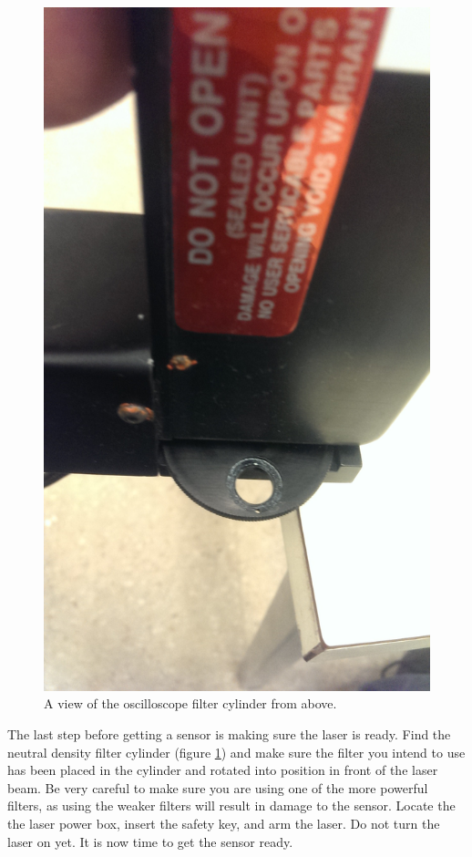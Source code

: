 \documentclass{report}
\begin{document}
            \begin{figure}[h] 
                \includegraphics[height=.4\textheight]{laser_00}
                \centering
                \caption{ A view of the oscilloscope filter cylinder from above. }
                \label{fig:laser_00}
            \end{figure}

            The last step before getting a sensor is making sure the laser is ready. Find the neutral density filter cylinder (figure \ref{fig:laser_00}) and make sure the filter you intend to use has been placed in the cylinder and rotated into position in front of the laser beam. Be very careful to make sure you are using one of the more powerful filters, as using the weaker filters will result in damage to the sensor. Locate the the laser power box, insert the safety key, and arm the laser. Do not turn the laser on yet. It is now time to get the sensor ready.
\end{document}
